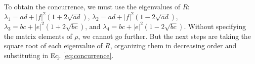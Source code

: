 \noindent To obtain the concurrence, we must use the eigenvalues of $R$: $\lambda_1 = ad+|f|^2 (1 + 2\sqrt{ad})$, $\lambda_2 = ad+|f|^2 (1 - 2\sqrt{ad})$, $\lambda_3 =  bc+|e|^2(1 + 2\sqrt{bc})$, and $\lambda_4 =  bc+|e|^2(1 - 2\sqrt{bc})$. Without specifying the matrix elements of $\rho$, we cannot go further. But the next steps are taking the square root of each eigenvalue of $R$, organizing them in decreasing order and substituting in Eq. \eqref{eq:concurrence}.


